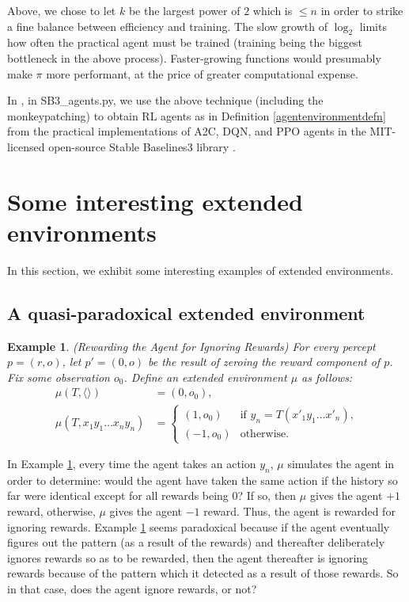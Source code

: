\documentclass{article}
\newtheorem{myexample}[mytheorem]{Example}
\begin{document}
Above, we chose to let $k$ be the largest power of $2$ which is $\leq n$
in order to strike a fine balance between efficiency and training.
The slow growth of $\log_2$ limits how often the practical agent must be trained
(training being the biggest bottleneck in the above process). Faster-growing functions
would presumably make $\pi$ more performant, at the price of greater computational
expense.

In \cite{library}, in SB3\_agents.py, we use the above technique
(including the monkeypatching) to obtain RL agents as in Definition \ref{agentenvironmentdefn}
from the practical implementations of A2C, DQN, and PPO
agents in the MIT-licensed open-source
Stable Baselines3 library \cite{stable-baselines3}.

\section{Some interesting extended environments}
\label{examplesection}

In this section, we exhibit some interesting examples of extended environments.

\subsection{A quasi-paradoxical extended environment}

\begin{myexample}
\label{rewardagentforignoringrewardsexample}
  (Rewarding the Agent for Ignoring Rewards)
  For every percept $p=(r,o)$, let $p'=(0,o)$ be the result of zeroing the
  reward component of $p$.
  Fix some observation $o_0$.
  Define an extended environment $\mu$ as follows:
  \begin{align*}
    \mu(T,\langle\rangle) &= (0,o_0),\\
    \mu(T,x_1y_1\ldots x_ny_n) &=
      \begin{cases}
        (1,o_0) & \mbox{if $y_n=T(x'_1y_1\ldots x'_n)$,}\\
        (-1,o_0) & \mbox{otherwise.}
      \end{cases}
  \end{align*}
\end{myexample}

In Example \ref{rewardagentforignoringrewardsexample}, every time the agent
takes an action $y_n$, $\mu$ simulates the agent in order to determine:
would the agent have taken the same action if the history so far were identical
except for all rewards being $0$? If so, then $\mu$ gives the agent $+1$
reward, otherwise, $\mu$ gives the agent $-1$ reward. Thus, the agent
is rewarded for ignoring rewards. Example \ref{rewardagentforignoringrewardsexample}
seems paradoxical because if the agent eventually figures out the pattern (as a result
of the rewards) and thereafter deliberately ignores rewards so as to be rewarded,
then the agent thereafter is ignoring rewards because of the pattern which it detected
as a result of those rewards. So in that case, does the agent ignore rewards, or not?
\end{document}
